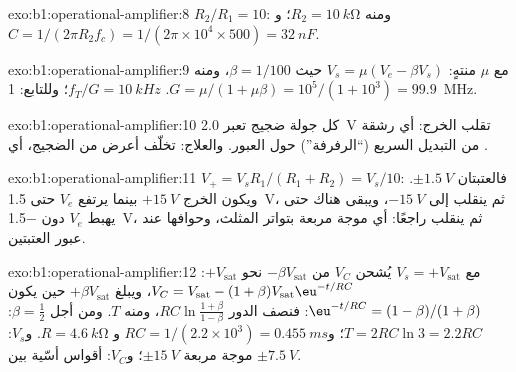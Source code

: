 \begin{solution}{exo:b1:operational-amplifier:8}
$R_2/R_1 = 10$: ومنه $R_2 = \qty{10}{k\ohm}$؛ و$C = 1/(2\pi R_2f_c) = 1/(2\pi
\times 10^4 \times 500) = \qty{32}{nF}$.
\end{solution}

\begin{solution}{exo:b1:operational-amplifier:9}
مع $\mu$ منتهٍ: $V_s = \mu(V_e - \beta V_s)$ حيث $\beta = 1/100$، ومنه
$G = \mu/(1 + \mu\beta) = 10^5/(1 + 10^3) = 99.9$.  $f_T/G =
\qty{10}{kHz}$؛ وللتابع: \qty{1}{MHz}.
\end{solution}

\begin{solution}{exo:b1:operational-amplifier:10}
كل جولة ضجيج تعبر \qty{2.0}{V} تقلب الخرج: أي رشقة من
التبديل السريع (``الرفرفة'') حول العبور. والعلاج: تخلّف
أعرض من الضجيج، أي .
\end{solution}

\begin{solution}{exo:b1:operational-amplifier:11}
$V_+ = V_sR_1/(R_1 + R_2) = V_s/10$: فالعتبتان $\pm\qty{1.5}{V}$. ويكون
الخرج $+\qty{15}{V}$ بينما يرتفع $V_e$ حتى \qty{1.5}{V}، ثم ينقلب إلى
$-\qty{15}{V}$، ويبقى هناك حتى يهبط $V_e$ دون \qty{-1.5}{V}، ثم ينقلب
راجعًا: أي موجة مربعة بتواتر المثلث، وحوافها عند
عبور العتبتين.
\end{solution}

\begin{solution}{exo:b1:operational-amplifier:12}
مع $V_s = +V_{\mathrm{sat}}$ يُشحن $V_C$ من $-\beta V_{\mathrm{sat}}$
نحو $+V_{\mathrm{sat}}$: $V_C = V_{\mathrm{sat}} - (1 + \beta)V_{\mathrm{sat}}
\eu^{-t/RC}$، ويبلغ $+\beta V_{\mathrm{sat}}$ حين يكون $\eu^{-t/RC} =
(1 - \beta)/(1 + \beta)$: فنصف الدور $RC\ln\frac{1 + \beta}{1 - \beta}$،
ومنه $T$. ومن أجل $\beta = \tfrac12$: $T = 2RC\ln 3 = 2.2RC$؛ و$RC = 1/(2.2 \times
10^3) = \qty{0.455}{ms}$ و $R = \qty{4.6}{k\ohm}$. و$V_s$: موجة مربعة
$\pm\qty{15}{V}$؛ و$V_C$: أقواس أسّية بين $\pm\qty{7.5}{V}$.
\end{solution}

